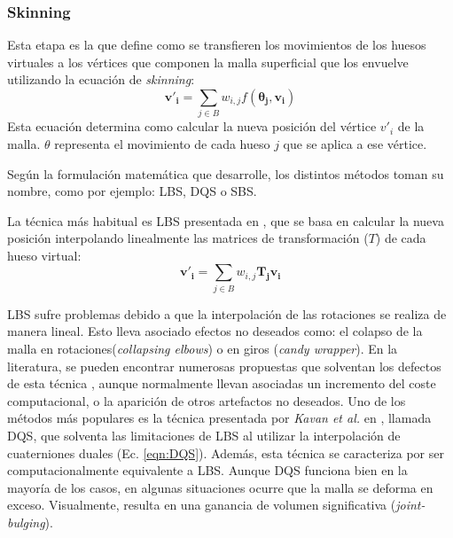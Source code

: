 \subsubsection{Skinning}
\label{art:skinning}

Esta etapa es la que define como se transfieren los movimientos de los huesos virtuales a los vértices que componen la malla superficial que los envuelve utilizando la ecuación de \emph{skinning}: 
\begin{equation}
\label{eqn:skinning}
\mathbf{v'_{i}} = \sum_{j \in B} w_{i,j}f(\mathbf{\theta_{j}},\mathbf{v_{i}}) 
\end{equation}
Esta ecuación determina como calcular la nueva posición del vértice $v'_{i}$ de la malla. $\theta$ representa el movimiento de cada hueso $j$ que se aplica a ese vértice. %

Según la formulación matemática que desarrolle, los distintos métodos toman su nombre, como por ejemplo: \ac{LBS}\cite{thalmann88}, \ac{DQS}\cite{Kavan2008} o \ac{SBS}\cite{Kavan:2005}.



La técnica más habitual es \ac{LBS} presentada en \cite{thalmann88}, que se basa en calcular la nueva posición interpolando linealmente las matrices de transformación ($T$) de cada hueso virtual:
\begin{equation}
\label{eqn:LBS}
\mathbf{v'_{i}} = \sum_{j \in B} w_{i,j}\mathbf{T_{j}v_{i}}
\end{equation}

\ac{LBS} sufre problemas debido a que la interpolación de las rotaciones se realiza de manera lineal. Esto lleva asociado efectos no deseados como: el colapso de la malla  en rotaciones(\emph{collapsing elbows}) o en giros (\emph{candy wrapper}). En la literatura, se pueden encontrar numerosas propuestas que solventan los defectos de esta técnica \cite{rumman2016state}, aunque normalmente llevan asociadas un incremento del coste computacional, o la aparición de otros artefactos no deseados. Uno de los métodos más populares es la técnica presentada por \emph{Kavan et al.} en \cite{Kavan2008}, llamada \ac{DQS}, que solventa las limitaciones de \ac{LBS} al utilizar la interpolación de cuaterniones duales (Ec. \ref{eqn:DQS}). Además, esta técnica se caracteriza por ser computacionalmente equivalente a \ac{LBS}. Aunque \ac{DQS} funciona bien en la mayoría de los casos, en algunas situaciones ocurre que la malla se deforma en exceso. Visualmente, resulta en una ganancia de volumen significativa (\emph{joint-bulging}). 


